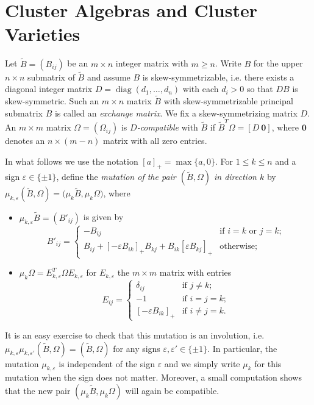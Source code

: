 \documentclass{amsart}
\newcommand{\diag}{\operatorname{diag}}
\renewcommand{\max}{\operatorname{max}}
\begin{document}
\section{Cluster Algebras and Cluster Varieties}
\label{sec:cluster}

Let $\tilde B=(B_{ij})$ be an $m\times n$ integer matrix with $m\ge n$.  
Write $B$ for the upper $n\times n$ submatrix of $\tilde B$ and assume $B$ is skew-symmetrizable, i.e. there exists a diagonal integer matrix $D=\diag(d_1,\ldots,d_n)$ with each $d_i>0$ so that $DB$ is skew-symmetric. 
Such an $m\times n$ matrix $\tilde B$ with skew-symmetrizable principal submatrix $B$ is called an \emph{exchange matrix}.
We fix a skew-symmetrizing matrix $D$.
An $m\times m$ matrix $\Omega=(\Omega_{ij})$ is \emph{$D$-compatible} with $\tilde B$ if $\tilde B^T\Omega=[D\ \boldsymbol{0}]$, where $\boldsymbol{0}$ denotes an $n\times(m-n)$ matrix with all zero entries.

In what follows we use the notation $[a]_+=\max\{a,0\}$.
For $1\le k\le n$ and a sign $\varepsilon\in\{\pm1\}$, define the \emph{mutation of the pair $(\tilde B,\Omega)$ in direction $k$} by $\mu_{k,\varepsilon}(\tilde B,\Omega)=\big(\mu_k\tilde B,\mu_k\Omega\big)$, where
\begin{itemize}
  \item $\mu_{k,\varepsilon}\tilde B=(B'_{ij})$ is given by
    \[B'_{ij}=\begin{cases}-B_{ij} & \text{if $i=k$ or $j=k$;}\\ B_{ij}+[-\varepsilon B_{ik}]_+B_{kj}+B_{ik}[\varepsilon B_{kj}]_+ & \text{otherwise;}\end{cases}\]
  \item $\mu_k\Omega=E_{k,\varepsilon}^T\Omega E_{k,\varepsilon}$ for $E_{k,\varepsilon}$ the $m\times m$ matrix with entries
    \[E_{ij}=\begin{cases}\delta_{ij} & \text{if $j\ne k$;}\\ -1 & \text{if $i=j=k$;}\\ [-\varepsilon B_{ik}]_+ & \text{if $i\ne j=k$.}\end{cases}\]
\end{itemize}
It is an easy exercise to check that this mutation is an involution, i.e.\ $\mu_{k,\varepsilon}\mu_{k,\varepsilon'}(\tilde B,\Omega)=(\tilde B,\Omega)$ for any signs $\varepsilon,\varepsilon'\in\{\pm1\}$.
In particular, the mutation $\mu_{k,\varepsilon}$ is independent of the sign $\varepsilon$ and we simply write $\mu_k$ for this mutation when the sign does not matter.
Moreover, a small computation shows that the new pair $(\mu_k\tilde B,\mu_k\Omega)$ will again be compatible.
\end{document}
